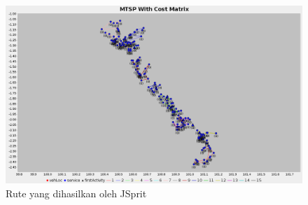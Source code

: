 \begin{figure}[!]
	\centering
	\includegraphics[width=\textwidth]{Resources/Images/analysis_mtsp_no_time_windows}
	\caption{Rute yang dihasilkan oleh JSprit}
	\label{fig:analysis_mtsp_recommendation}
\end{figure}



